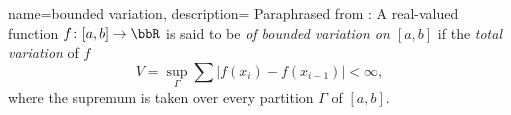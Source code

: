
%
{%
  name={bounded variation},%
  description={%
    Paraphrased from \cite{wheeden-zygmund}: A real-valued function
    $f\colon[a,b]\to\bbR$ is said to be \emph{of bounded variation on
      $[a,b]$} if the \emph{total variation} of $f$
    \[
      V=\sup_{\Gamma}\sum |f(x_i)-f(x_{i-1})|<\infty,
    \]
    where the supremum is taken over every partition $\Gamma$ of $[a,b]$.%
  }%
}

